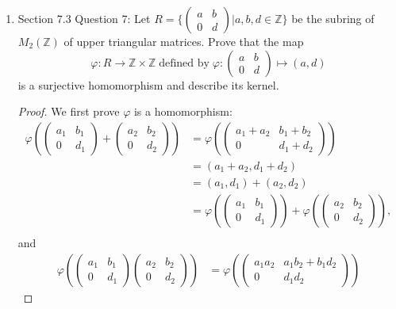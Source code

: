 \documentclass{article}
\begin{document}
\begin{enumerate}[label={\bf Q\arabic*:}]
  \item Section 7.3 Question 7: Let
    $R=\{\begin{pmatrix}a&b\\0&d\end{pmatrix}|a,b,d\in\mathbb{Z}\}$ be the
    subring of $M_2(\mathbb{Z})$ of upper triangular matrices. Prove that
    the map \[\varphi:R\rightarrow\mathbb{Z}\times\mathbb{Z}\;
    \text{defined by}\;
    \varphi:\begin{pmatrix}a&b\\0&d\end{pmatrix}\mapsto(a,d)\] is a
    surjective homomorphism and describe its kernel.

    \begin{proof}
      We first prove $\varphi$ is a homomorphism:
      \begin{align*}
        \varphi(\begin{pmatrix}a_1&b_1\\0&d_1\end{pmatrix}+
        \begin{pmatrix}a_2&b_2\\0&d_2\end{pmatrix}) &=
        \varphi(\begin{pmatrix}a_1+a_2&b_1+b_2\\0&d_1+d_2\end{pmatrix})
        \\
          &= (a_1+a_2,d_1+d_2) \\
          &= (a_1,d_1)+(a_2,d_2) \\
          &= \varphi(\begin{pmatrix}a_1&b_1\\0&d_1\end{pmatrix})+ \varphi(
            \begin{pmatrix}a_2&b_2\\0&d_2\end{pmatrix}), \\
      \end{align*}
      and
      \begin{align*}
        \varphi(\begin{pmatrix}a_1&b_1\\0&d_1\end{pmatrix}
        \begin{pmatrix}a_2&b_2\\0&d_2\end{pmatrix}) &=
        \varphi(\begin{pmatrix}a_1a_2&a_1b_2+b_1d_2\\0&d_1d_2\end{pmatrix})

\end{align*}
\end{proof}
\end{enumerate}
\end{document}

